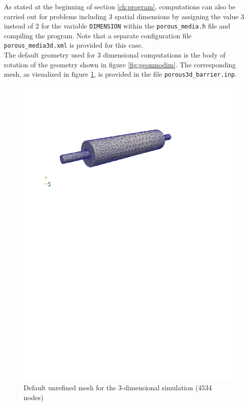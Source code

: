 \documentclass{article}
\begin{document}
As stated at the beginning of section \ref{ch:program}, computations can also be carried out for problems including 3 spatial dimensions by assigning the value 3 instead of 2 for the variable \texttt{DIMENSION} within the \texttt{porous\_media.h} file and compiling the program. Note that a separate  configuration file \texttt{porous\_media3d.xml} is provided for this case.\\
The default geometry used for 3 dimensional computations is the body of rotation of the geometry shown in figure \ref{fig:geomnodim}. The corresponding mesh, as visualized in figure \ref{fig:porous3d_barrierfine}, is provided in the file \texttt{porous3d\_barrier.inp}.
\begin{figure}[!hb]
\centering
\includegraphics[width=\textwidth,trim=.3cm 20.8cm 2cm 3.7cm, clip=true]{fig/porous3d_barrierfine.pdf}
\caption{Default unrefined mesh for the 3-dimensional simulation (4534 nodes)}
\label{fig:porous3d_barrierfine}
\end{figure}
\end{document}
